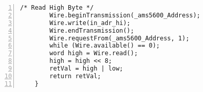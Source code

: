 \begin{lstlisting}[numbers=left,basicstyle=\tiny,caption={Zdrojový kód súboru AeroShield.cpp.},captionpos=b]
		/* Read High Byte */
		Wire.beginTransmission(_ams5600_Address);       
		Wire.write(in_adr_hi);                    
		Wire.endTransmission();                       
		Wire.requestFrom(_ams5600_Address, 1);        
		while (Wire.available() == 0);               
		word high = Wire.read();                    
		high = high << 8;                             
		retVal = high | low;
		return retVal;                                
	}	
\end{lstlisting}